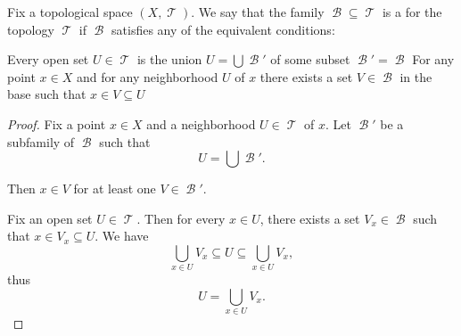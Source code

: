 \begin{definition}\label{def:topological_base}\mcite\cite[12]{Engelking1989}
  Fix a topological space \( (X, \mscrT) \). We say that the family \( \mscrB \subseteq \mscrT \) is a  for the topology \( \mscrT \) if \( \mscrB \) satisfies any of the equivalent conditions:
  \begin{thmenum}
     Every open set \( U \in \mscrT \) is the union \( U = \bigcup \mscrB' \) of some subset \( \mscrB' = \mscrB \)
     For any point \( x \in X \) and for any neighborhood \( U \) of \( x \) there exists a set \( V \in \mscrB \) in the base such that \( x \in V \subseteq U \)
  \end{thmenum}
\end{definition}
\begin{proof}
   Fix a point \( x \in X \) and a neighborhood \( U \in \mscrT \) of \( x \). Let \( \mscrB' \) be a subfamily of \( \mscrB \) such that
  \begin{equation*}
    U = \bigcup \mscrB'.
  \end{equation*}

  Then \( x \in V \) for at least one \( V \in \mscrB' \).

   Fix an open set \( U \in \mscrT \). Then for every \( x \in U \), there exists a set \( V_x \in \mscrB \) such that \( x \in V_x \subseteq U \). We have
  \begin{equation*}
    \bigcup_{x \in U} V_x \subseteq U \subseteq \bigcup_{x \in U} V_x,
  \end{equation*}
  thus
  \begin{equation*}
    U = \bigcup_{x \in U} V_x.
  \end{equation*}
\end{proof}

